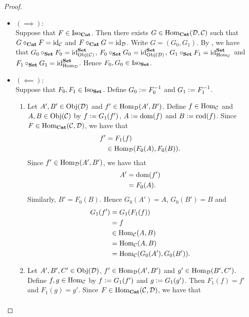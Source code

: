 \documentclass{book}
\begin{document}
	\begin{proof}\
		\begin{itemize}
			\item $(\implies)$: \\
			Suppose that $F \in \Iso_{\bCat}$. Then there exists $G \in \Hom_{\bCat}(\MD, \MC)$ such that $G \circ_{\bCat} F = \id_{\MC}$ and $F \circ_{\bCat} G = \id_{\MD}$. Write $G = (G_0, G_1)$. By , we have that $G_0 \circ_{\bSet} F_0 = \id_{\Obj(\MC)}^{\bSet}$, $F_0 \circ_{\bSet} G_0 = \id_{\Obj(\MD)}^{\bSet}$, $G_1 \circ_{\bSet} F_1 = \id_{\Hom_{\MC}}^{\bSet}$ and $F_1 \circ_{\bSet} G_1 = \id_{\Hom_{\MD}}^{\bSet}$. Hence $F_0, G_0 \in \Iso_{\bSet}$.  
			\item $(\impliedby)$: \\
			Suppose that $F_0, F_1 \in \Iso_{\bSet}$. Define $G_0 \defeq F_0^{-1}$ and  $G_1 \defeq F_1^{-1}$.
			\begin{enumerate}
				\item Let $A', B' \in \Obj(\MD)$ and $f' \in \Hom_{\MD}(A', B')$. Define $f \in \Hom_{\MC}$ and $A,B \in \Obj(\MC)$ by $f \defeq G_1(f')$, $A \defeq \dom(f)$ and $B \defeq \cod(f)$. Since $F \in \Hom_{\bCat}(\MC, \MD)$, we have that 
				\begin{align*}
					f'
					& = F_1(f) \\
					& \in \Hom_{\MD}(F_0(A), F_0(B)).
				\end{align*}   
				Since $f' \in \Hom_{\MD}(A', B')$, we have that 
				\begin{align*}
					A'
					& = \dom(f') \\
					& = F_0(A).
				\end{align*}
				Similarly, $B' = F_0(B)$. Hence $G_0(A') = A$, $G_0(B') = B$ and 
				\begin{align*}
					G_1(f')
					& = G_1(F_1(f)) \\
					& = f \\
					& \in \Hom_{\MC}(A, B) \\
					& =  \Hom_{\MC}(A, B) \\
					& = \Hom_{\MC}(G_0(A'), G_0(B')).
				\end{align*}
				\item Let $A',B', C' \in \Obj(\MD)$, $f' \in \Hom_{\MD}(A', B')$ and $g' \in \Hom_{\MD}(B', C')$. Define $f,g \in \Hom_{\MC}$ by $f \defeq G_1(f')$ and $g \defeq G_1(g')$. Then $F_1(f) = f'$ and $F_1(g) = g'$. Since $F \in \Hom_{\bCat}(\MC, \MD)$, we have that
				\begin{align*}

\end{align*}
\end{enumerate}
\end{itemize}
\end{proof}
\end{document}
